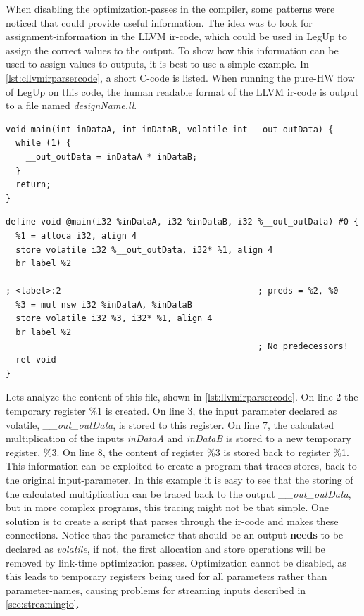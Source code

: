 When disabling the optimization-passes in the compiler, some patterns were noticed that could provide useful information. The idea was to look for assignment-information in the LLVM \gls{ir}-code, which could be used in LegUp to assign the correct values to the output. To show how this information can be used to assign values to outputs, it is best to use a simple example. In \cref{lst:cllvmirparsercode}, a short C-code is listed. When running the pure-HW flow of LegUp on this code, the human readable format of the LLVM \gls{ir}-code is output to a file named \textit{designName.ll}.
\clearpage
\lstset{language=C,style=Cstyle}
\begin{lstlisting}[caption={Simple C-code example for LLVM IR parsing},label=lst:cllvmirparsercode]
void main(int inDataA, int inDataB, volatile int __out_outData) {
  while (1) {
    __out_outData = inDataA * inDataB;
  }
  return;
}
\end{lstlisting}
\lstset{language=LLVM,style=LLVMStyle}
\begin{lstlisting}[caption={LLVM IR code for simple parsing example},label=lst:llvmirparsercode]
define void @main(i32 %inDataA, i32 %inDataB, i32 %__out_outData) #0 {
  %1 = alloca i32, align 4
  store volatile i32 %__out_outData, i32* %1, align 4
  br label %2

; <label>:2                                       ; preds = %2, %0
  %3 = mul nsw i32 %inDataA, %inDataB
  store volatile i32 %3, i32* %1, align 4
  br label %2
                                                  ; No predecessors!
  ret void
}
\end{lstlisting}
Lets analyze the content of this file, shown in \cref{lst:llvmirparsercode}. On line 2 the temporary register \%1 is created. On line 3, the input parameter declared as volatile, \textit{\_\_out\_outData}, is stored to this register. On line 7, the calculated multiplication of the inputs \textit{inDataA} and \textit{inDataB} is stored to a new temporary register, \%3. On line 8, the content of register \%3 is stored back to register \%1. This information can be exploited to create a program that traces stores, back to the original input-parameter. In this example it is easy to see that the storing of the calculated multiplication can be traced back to the output \textit{\_\_out\_outData}, but in more complex programs, this tracing might not be that simple. One solution is to create a script that parses through the \gls{ir}-code and makes these connections. Notice that the parameter that should be an output \textbf{needs} to be declared as \textit{volatile}, if not, the first allocation and store operations will be removed by link-time optimization passes. Optimization cannot be disabled, as this leads to temporary registers being used for all parameters rather than parameter-names, causing problems for streaming inputs described in \cref{sec:streamingio}.

